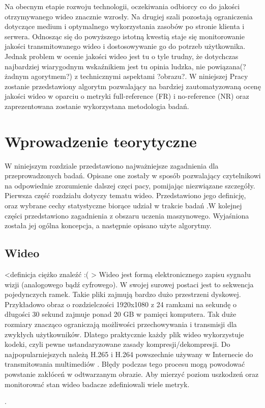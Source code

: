 Na obecnym etapie rozwoju technologii, oczekiwania odbiorcy co do jakości otrzymywanego wideo znacznie wzrosły. Na drugiej szali pozostają ograniczenia dotyczące medium i optymalnego wykorzystania zasobów po stronie klienta i serwera. Odnosząc się do powyższego istotną kwestią staje się monitorowanie jakości transmitowanego wideo i dostosowywanie go do potrzeb użytkownika. Jednak problem w ocenie jakości wideo jest tu o tyle trudny, że dotychczas najbardziej wiarygodnym wskaźnikiem jest tu opinia ludzka, nie powiązana(?żadnym agorytmem?) z technicznymi aspektami ?obrazu?. W niniejszej Pracy zostanie przedstawiony algorytm pozwalający na bardziej zautomatyzowaną ocenę jakości wideo w oparciu o metryki full-reference (FR) i no-reference (NR) oraz zaprezentowana zostanie wykorzystana metodologia badań.



\chapter{Wprowadzenie teorytyczne}
\label{cha:pierwszyDokument}

W niniejszym rozdziale przedstawiono najważniejsze zagadnienia dla przeprowadzonych badań. Opisane one zostały w sposób pozwalający czytelnikowi na odpowiednie zrozumienie dalszej częci pacy, pomijając niezwiązane szczegóły. Pierwsza część rozdziału dotyczy tematu wideo. Przedstawiono jego definicję, oraz wybrane cechy statystyczne biorące udział w trakcie badań .W kolejnej części przedstawiono zagadnienia z obszaru uczenia maszynowego. Wyjaśniona została jej ogólna koncepcja, a następnie opisano użyte algorytmy.


\section{Wideo}

<definicja ciężko znaleźć :( >
Wideo jest formą elektronicznego zapisu sygnału wizji (analogowego bądź cyfrowego). W swojej surowej postaci jest to sekwencja pojedynczych ramek. Takie pliki zajmują bardzo dużo przestrzeni dyskowej. Przykładowo obraz o rozdzielczości 1920x1080 z 24 ramkami na sekundę o długości 30 sekund zajmuje ponad 20 GB w pamięci komputera. Tak duże rozmiary znacząco ograniczają możliwości przechowywania i transmisji dla zwykłych użytkowników. Dlatego praktycznie każdy plik wideo wykorzystuje kodeki, czyli pewne ustandaryzowane zasady kompresji/dekompresji. Do najpopularniejszych należą H.265 i H.264 powszechnie używany w Internecie do transmitowania multimediów \cite{video_codecs}. Błędy podczas tego procesu mogą powodować powstanie zakłóceń w odtwarzanym obrazie. Aby mierzyć poziom uszkodzeń oraz monitorować stan wideo badacze zdefiniowali wiele metryk.\par.

